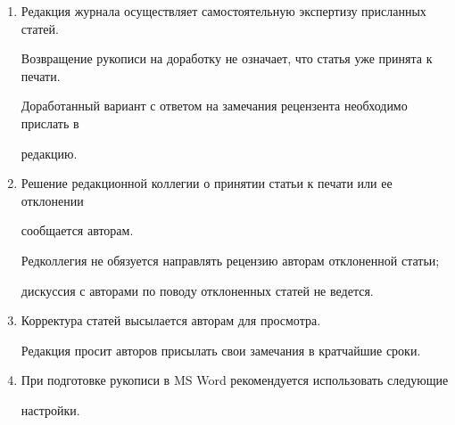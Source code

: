 {{\begin{enumerate}
автора (или всех авторов): фамилия, полные имя и отчество, телефон, факс, e-mail, 


почтовый адрес. Если работа выполнена несколькими авторами, указывается фамилия 


одного из них, ответственного за переписку с редакцией.\\ [-13.5pt]





\item Редакция журнала осуществляет самостоятельную экспертизу присланных статей.  


Возвращение рукописи на доработку не означает, что статья уже принята к печати.  


Доработанный вариант с ответом на замечания рецензента необходимо прислать в 


редакцию.\\[-13.5pt]





\item Решение редакционной коллегии о принятии статьи к печати или ее отклонении 


сообщается авторам.  





Редколлегия не обязуется направлять рецензию авторам отклоненной статьи; 


дискуссия с авторами по поводу отклоненных статей не ведется.\\[-13.5pt]


\pagebreak





\vspace*{-48pt}





\item Корректура статей высылается авторам для просмотра.  


Редакция просит авторов присылать свои замечания в кратчайшие сроки.\\[-13.5pt] 





\item При подготовке рукописи в MS Word рекомендуется использовать сле\-ду\-ющие 


настройки.\\



\end{enumerate}}}

